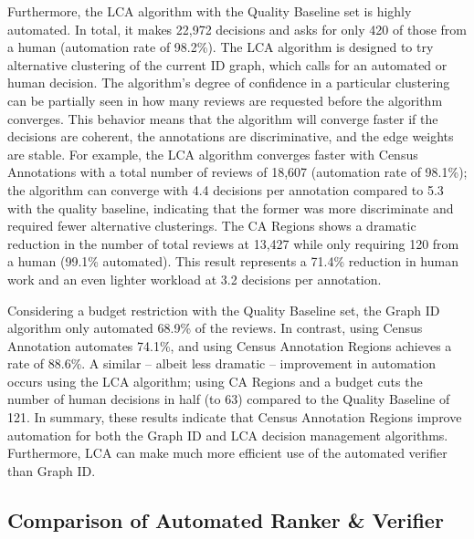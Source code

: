 Furthermore, the LCA algorithm with the Quality Baseline set is highly automated.  In total, it makes 22,972 decisions and asks for only 420 of those from a human (automation rate of 98.2\%).  The LCA algorithm is designed to try alternative clustering of the current ID graph, which calls for an automated or human decision.  The algorithm's degree of confidence in a particular clustering can be partially seen in how many reviews are requested before the algorithm converges.  This behavior means that the algorithm will converge faster if the decisions are coherent, the annotations are discriminative, and the edge weights are stable. For example, the LCA algorithm converges faster with Census Annotations with a total number of reviews of 18,607 (automation rate of 98.1\%); the algorithm can converge with 4.4 decisions per annotation compared to 5.3 with the quality baseline, indicating that the former was more discriminate and required fewer alternative clusterings.  The CA Regions shows a dramatic reduction in the number of total reviews at 13,427 while only requiring 120 from a human (99.1\% automated).  This result represents a 71.4\% reduction in human work and an even lighter workload at 3.2 decisions per annotation.

Considering a budget restriction with the Quality Baseline set, the Graph ID algorithm only automated 68.9\% of the reviews. In contrast, using Census Annotation automates 74.1\%, and using Census Annotation Regions achieves a rate of 88.6\%.  A similar -- albeit less dramatic -- improvement in automation occurs using the LCA algorithm; using CA Regions and a budget cuts the number of human decisions in half (to 63) compared to the Quality Baseline of 121.  In summary, these results indicate that Census Annotation Regions improve automation for both the Graph ID and LCA decision management algorithms.  Furthermore, LCA can make much more efficient use of the automated verifier than Graph ID.


\subsection{Comparison of Automated Ranker \& Verifier}


